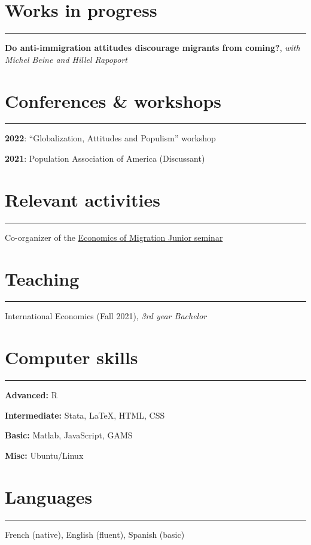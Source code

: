 \documentclass{article}
\newcommand{\sectionline}{%
  \vspace{-0.5cm}%
  \par\noindent\rule{\textwidth}{0.4pt}%
  \vspace{0.3cm}%
}
\let\xsection=\section
\renewcommand{\section}[1]{%
  \vspace{0.4cm}%
  \xsection*{#1}%
  \sectionline%
}
\begin{document}
\hypertarget{works-in-progress}{%
\section{Works in progress}\label{works-in-progress}}

\textbf{Do anti-immigration attitudes discourage migrants from coming?},
\emph{with Michel Beine and Hillel Rapoport}

\hypertarget{conferences-workshops}{%
\section{Conferences \& workshops}\label{conferences-workshops}}

\textbf{2022}: ``Globalization, Attitudes and Populism'' workshop

\textbf{2021}: Population Association of America (Discussant)

\hypertarget{relevant-activities}{%
\section{Relevant activities}\label{relevant-activities}}

Co-organizer of the
\href{https://sites.google.com/view/the-economics-of-migration}{Economics
of Migration Junior seminar}

\hypertarget{teaching}{%
\section{Teaching}\label{teaching}}

International Economics (Fall 2021), \emph{3rd year Bachelor}

\hypertarget{computer-skills}{%
\section{Computer skills}\label{computer-skills}}

\textbf{Advanced:} R

\textbf{Intermediate:} Stata, LaTeX, HTML, CSS

\textbf{Basic:} Matlab, JavaScript, GAMS

\textbf{Misc:} Ubuntu/Linux

\hypertarget{languages}{%
\section{Languages}\label{languages}}

French (native), English (fluent), Spanish (basic)
\end{document}
